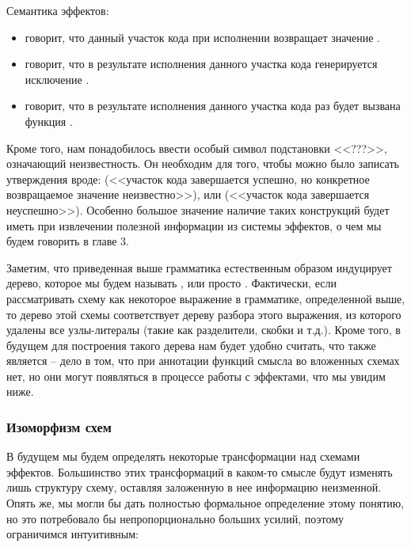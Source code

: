 Семантика эффектов:

\begin{itemize}
    \item {} говорит, что данный участок кода при исполнении возвращает значение .
    
    \item {} говорит, что в результате исполнения данного участка кода генерируется исключение .
    
    \item {} говорит, что в результате исполнения данного участка кода  раз будет вызвана функция .
\end{itemize}

Кроме того, нам понадобилось ввести особый символ подстановки <<???>>, означающий неизвестность. Он необходим для того, чтобы можно было записать утверждения вроде:  (<<участок кода завершается успешно, но конкретное возвращаемое значение неизвестно>>), или  (<<участок кода завершается неуспешно>>). Особенно большое значение наличие таких конструкций будет иметь при извлечении полезной информации из системы эффектов, о чем мы будем говорить в главе 3.

Заметим, что приведенная выше грамматика естественным образом индуцирует дерево, которое мы будем называть , или просто . Фактически, если рассматривать схему как некоторое выражение в грамматике, определенной выше, то дерево этой схемы соответствует дереву разбора этого выражения, из которого удалены все узлы-литералы (такие как разделители, скобки и т.д.). Кроме того, в будущем для построения такого дерева нам будет удобно считать, что  также является  -- дело в том, что при аннотации функций смысла во вложенных схемах нет, но они могут появляться в процессе работы с эффектами, что мы увидим ниже.


\subsubsection{Изоморфизм схем}

В будущем мы будем определять некоторые трансформации над схемами эффектов. Большинство этих трансформаций в каком-то смысле будут изменять лишь структуру схему, оставляя заложенную в нее информацию неизменной. Опять же, мы могли бы дать полностью формальное определение этому понятию, но это потребовало бы непропорционально больших усилий, поэтому ограничимся интуитивным:

